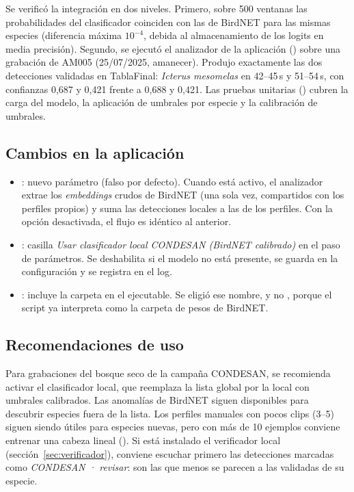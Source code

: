 \documentclass[11pt,a4paper]{article}
\newcommand{\spp}[1]{\textit{#1}}
\begin{document}
Se verificó la integración en dos niveles. Primero, sobre 500 ventanas las probabilidades del clasificador coinciden con las de BirdNET para
las mismas especies (diferencia máxima $10^{-4}$, debida al almacenamiento de los logits en media precisión). Segundo, se ejecutó el analizador de la
aplicación () sobre una grabación de AM005 (25/07/2025, amanecer). Produjo exactamente las dos detecciones validadas
en TablaFinal: \spp{Icterus mesomelas} en 42--45\,s y 51--54\,s, con confianzas 0,687 y 0,421 frente a 0,688 y 0,421. Las pruebas unitarias
() cubren la carga del modelo, la aplicación de umbrales por especie y la calibración de umbrales.

\subsection{Cambios en la aplicación}
\begin{itemize}
  \item {}: nuevo parámetro  (falso por defecto). Cuando está activo, el analizador extrae los \emph{embeddings}
        crudos de BirdNET (una sola vez, compartidos con los perfiles propios) y suma las detecciones locales a las de los perfiles. Con la opción
        desactivada, el flujo es idéntico al anterior.
  \item {}: casilla \emph{Usar clasificador local CONDESAN (BirdNET calibrado)} en el paso de parámetros. Se deshabilita si el modelo no está
        presente, se guarda en la configuración y se registra en el log.
  \item {}: incluye la carpeta  en el ejecutable. Se eligió ese nombre, y no , porque el script ya
        interpreta  como la carpeta de pesos de BirdNET.
\end{itemize}

\subsection{Recomendaciones de uso}
Para grabaciones del bosque seco de la campaña CONDESAN, se recomienda activar el clasificador local, que reemplaza la lista global por la local con umbrales
calibrados. Las anomalías de BirdNET siguen disponibles para descubrir especies fuera de la lista. Los perfiles manuales con pocos clips (3--5) siguen siendo útiles
para especies nuevas, pero con más de 10 ejemplos conviene entrenar una cabeza lineal ().
Si está instalado el verificador local (sección~\ref{sec:verificador}), conviene escuchar primero las detecciones marcadas como
\emph{CONDESAN · revisar}: son las que menos se parecen a las validadas de su especie.
\end{document}

